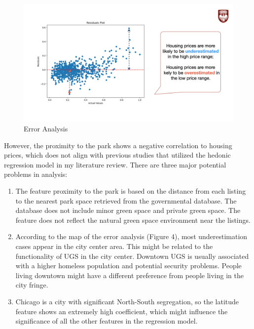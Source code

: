 \begin{figure}[h]
    \centering
    \includegraphics[width=1\textwidth]{Visual/final_error.jpeg}
    \caption{Error Analysis}
\end{figure}

However, the proximity to the park shows a negative correlation to housing prices, which does not align with previous studies that utilized the hedonic regression model in my literature review. There are three major potential problems in analysis:

\begin{enumerate}
    \item The feature proximity to the park is based on the distance from each listing to the nearest park space retrieved from the governmental database. The database does not include minor green space and private green space. The feature does not reflect the natural green space environment near the listings.
    \item According to the map of the error analysis (Figure 4), most underestimation cases appear in the city center area. This might be related to the functionality of UGS in the city center. Downtown UGS is usually associated with a higher homeless population and potential security problems. People living downtown might have a different preference from people living in the city fringe.
    \item Chicago is a city with significant North-South segregation, so the latitude feature shows an extremely high coefficient, which might influence the significance of all the other features in the regression model.
\end{enumerate}

